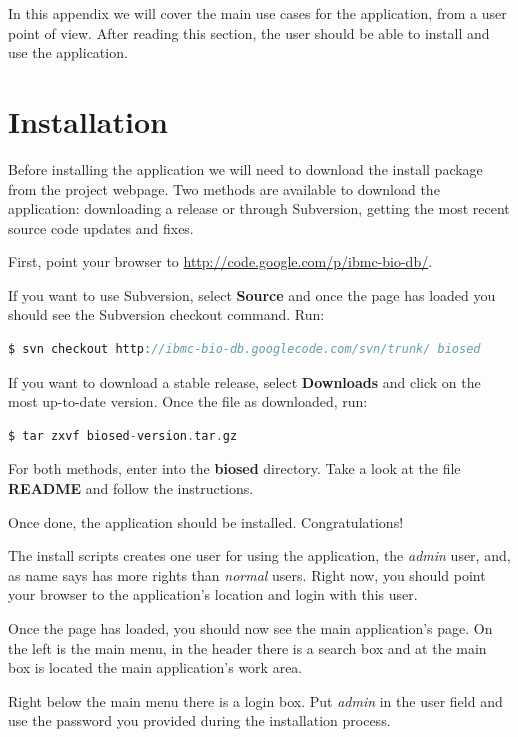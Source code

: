 
In this appendix we will cover the main use cases for the application, from a user point of view.
After reading this section, the user should be able to install and use the application.

\section{Installation}

Before installing the application we will need to download the install package from the project
webpage. Two methods are available to download the application: downloading a release or
through Subversion, getting the most recent source code updates and fixes.

First, point your browser to \url{http://code.google.com/p/ibmc-bio-db/}.

If you want to use Subversion, select \textbf{Source} and once the page has loaded
you should see the Subversion checkout command. Run:

\begin{lstlisting}[language=c, frame=single]
$ svn checkout http://ibmc-bio-db.googlecode.com/svn/trunk/ biosed
\end{lstlisting}

If you want to download a stable release, select \textbf{Downloads} and click on the most up-to-date
version. Once the file as downloaded, run:

\begin{lstlisting}[language=c, frame=single]
$ tar zxvf biosed-version.tar.gz
\end{lstlisting}

For both methods, enter into the \textbf{biosed} directory. Take a look at the file \textbf{README}
and follow the instructions.

Once done, the application should be installed. Congratulations!

The install scripts creates one user for using the application, the \textit{admin} user, and, as name
says has more rights than \textit{normal} users.
Right now, you should point your browser to the application's location and login with this user.

Once the page has loaded, you should now see the main application's page.
On the left is the main menu, in the header there is a search box and at the main box is located
the main application's work area.

Right below the main menu there is a login box. Put \textit{admin} in the user field and
use the password you provided during the installation process.

